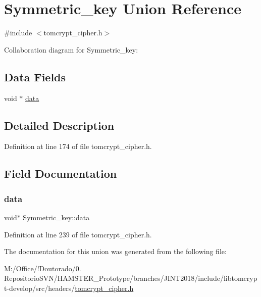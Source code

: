 \hypertarget{unionSymmetric__key}{}\section{Symmetric\+\_\+key Union Reference}
\label{unionSymmetric__key}


{\ttfamily \#include $<$tomcrypt\+\_\+cipher.\+h$>$}



Collaboration diagram for Symmetric\+\_\+key\+:
\subsection*{Data Fields}
\begin{DoxyCompactItemize}
\item 
void $\ast$ \mbox{\hyperlink{unionSymmetric__key_ad034a43a2755611e3854bb7b0add9d64}{data}}
\end{DoxyCompactItemize}


\subsection{Detailed Description}


Definition at line 174 of file tomcrypt\+\_\+cipher.\+h.



\subsection{Field Documentation}
\mbox{\label{unionSymmetric__key_ad034a43a2755611e3854bb7b0add9d64}} 
\subsubsection{\texorpdfstring{data}{data}}
{\footnotesize\ttfamily void$\ast$ Symmetric\+\_\+key\+::data}



Definition at line 239 of file tomcrypt\+\_\+cipher.\+h.



The documentation for this union was generated from the following file\+:\begin{DoxyCompactItemize}
\item 
M\+:/\+Office/!\+Doutorado/0. Repositorio\+S\+V\+N/\+H\+A\+M\+S\+T\+E\+R\+\_\+\+Prototype/branches/\+J\+I\+N\+T2018/include/libtomcrypt-\/develop/src/headers/\mbox{\hyperlink{tomcrypt__cipher_8h}{tomcrypt\+\_\+cipher.\+h}}\end{DoxyCompactItemize}
